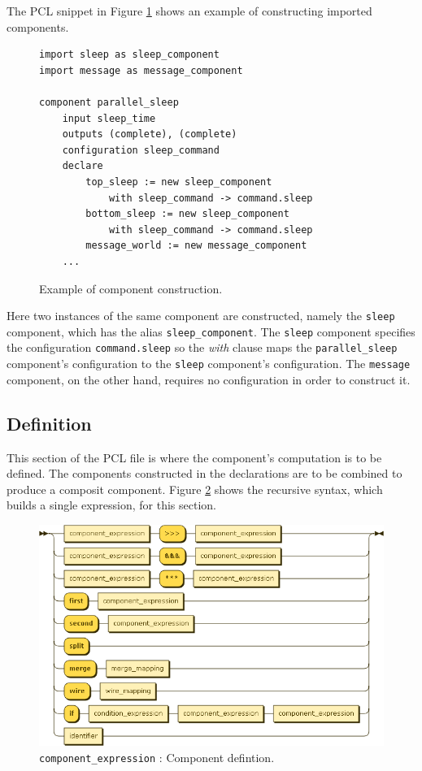 The PCL snippet in Figure \ref{fig:pcl-decl-example} shows an example of constructing imported components.
\begin{figure}[h!]
\begin{center}
\begin{verbatim}
import sleep as sleep_component
import message as message_component

component parallel_sleep
    input sleep_time
    outputs (complete), (complete)
    configuration sleep_command
    declare
        top_sleep := new sleep_component
            with sleep_command -> command.sleep
        bottom_sleep := new sleep_component
            with sleep_command -> command.sleep
        message_world := new message_component
    ...
\end{verbatim}
\end{center}
\caption{Example of component construction.}
\label{fig:pcl-decl-example}
\end{figure}
Here two instances of the same component are constructed, namely the \texttt{sleep} component, which has the alias \texttt{sleep\_component}. The \texttt{sleep} component specifies the configuration \texttt{command.sleep} so the \emph{with} clause maps the \texttt{parallel\_sleep} component's configuration to the \texttt{sleep} component's configuration. The \texttt{message} component, on the other hand, requires no configuration in order to construct it.

\subsection{Definition}
This section of the PCL file is where the component's computation is to be defined. The components constructed in the declarations are to be combined to produce a composit component. Figure \ref{fig:pcl-def} shows the recursive syntax, which builds a single expression, for this section.
\begin{figure}[h!]
  \centering
    \includegraphics[scale=\DiagramScale,angle=90]{chapters/compiler/diagrams/component_expression}
  \caption{\texttt{component\_expression} : Component defintion.}
  \label{fig:pcl-def}
\end{figure}

